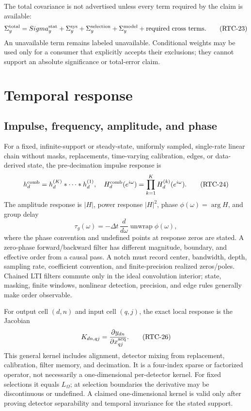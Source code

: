 \documentclass[11pt]{article}
\begin{document}
The total covariance is not advertised unless every term required by the
claim is available:
\begin{equation}
 \Sigma_y^{\rm total}=Sigma_y^{\rm stat}+\Sigma_y^{\rm sys}
   +\Sigma_y^{\rm selection}+\Sigma_y^{\rm model}
   +\hbox{required cross terms}.
 \tag{RTC-23}\label{eq:totalunc}
\end{equation}
An unavailable term remains labeled unavailable.  Conditional weights may be
used only for a consumer that explicitly accepts their exclusions; they
cannot support an absolute significance or total-error claim.

\section{Temporal response}

\subsection{Impulse, frequency, amplitude, and phase}

For a fixed, infinite-support or steady-state, uniformly sampled, single-rate
linear chain without masks, replacements, time-varying calibration, edges, or
data-derived state, the pre-decimation impulse response is
\begin{equation}
 h^{\rm comb}_d=h^{(K)}_d*\cdots*h^{(1)}_d,
 \quad
 H^{\rm comb}_d(e^{i\omega})=
   \prod_{k=1}^{K}H^{(k)}_d(e^{i\omega}).
 \tag{RTC-24}\label{eq:combinedH}
\end{equation}
The amplitude response is $|H|$, power response $|H|^2$, phase
$\phi(\omega)=\arg H$, and group delay
\begin{equation}
 \tau_g(\omega)=-\Delta t\,\frac{d}{d\omega}
                 \operatorname{unwrap}\phi(\omega),
 \tag{RTC-25}\label{eq:groupdelay}
\end{equation}
where the phase convention and undefined points at response zeros are stated.
A zero-phase forward/backward filter has different magnitude, boundary, and
effective order from a causal pass.  A notch must record center, bandwidth,
depth, sampling rate, coefficient convention, and finite-precision realized
zeros/poles.  Chained LTI filters commute only in the ideal convolution
interior; state, masking, finite windows, nonlinear detection, precision, and
edge rules generally make order observable.

For output cell $(d,n)$ and input cell $(q,j)$, the exact local response is the
Jacobian
\begin{equation}
 K_{dn,qj}=\frac{\partial y_{dn}}{\partial x^{\rm acq}_{qj}}.
 \tag{RTC-26}\label{eq:kernel}
\end{equation}
This general kernel includes alignment, detector mixing from replacement,
calibration, filter memory, and decimation.  It is a four-index sparse or
factorized operator, not necessarily a one-dimensional per-detector kernel.
For fixed selections it equals $L_{\Omega}$; at selection boundaries the
derivative may be discontinuous or undefined.  A claimed one-dimensional
kernel is valid only after proving detector separability and temporal
invariance for the stated support.
\end{document}
